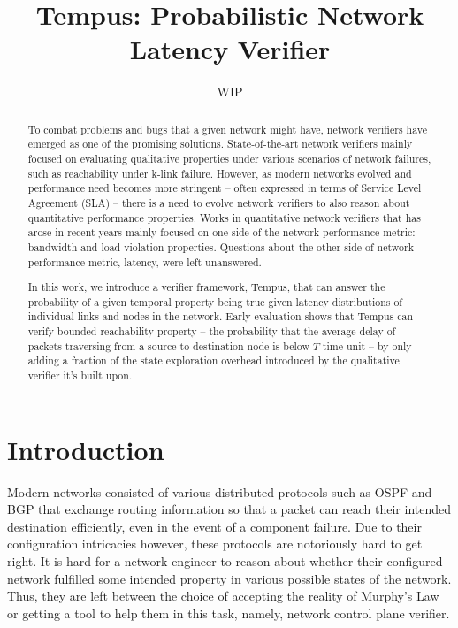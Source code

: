 \documentclass[10pt,sigconf,letterpaper,anonymous,nonacm]{acmart}
\title{Tempus: Probabilistic Network Latency Verifier}
\author{WIP}
\begin{document}
\begin{abstract}
    To combat problems and bugs that a given network might have, network verifiers have emerged as 
    one of the promising solutions. 
    State-of-the-art network verifiers mainly focused on evaluating qualitative properties under 
    various scenarios of network failures, such as reachability under k-link failure. 
    However, as modern networks evolved and performance need becomes more stringent -- often 
    expressed in terms of Service Level Agreement (SLA) -- there is a need to evolve network 
    verifiers to also reason about quantitative performance properties. 
    Works in quantitative network verifiers that has arose in recent years mainly focused on one 
    side of the network performance metric: bandwidth and load violation properties. 
    Questions about the other side of network performance metric, latency, were left unanswered. 

    In this work, we introduce a verifier framework, Tempus, that can answer the probability of 
    a given temporal property being true given latency distributions of individual links and 
    nodes in the network. 
    Early evaluation shows that Tempus can verify bounded reachability property -- the probability
    that the average delay of packets traversing from a source to destination node is below $T$
    time unit -- by only adding a fraction of the state exploration overhead introduced by the 
    qualitative verifier it's built upon.
\end{abstract}

\maketitle



\section{Introduction}
Modern networks consisted of various distributed protocols such as OSPF and BGP that exchange 
routing information so that a packet can reach their intended destination efficiently, even in the 
event of a component failure.
Due to their configuration intricacies however, these protocols are notoriously hard to get right. 
It is hard for a network engineer to reason about whether their configured network fulfilled some 
intended property in various possible states of the network. 
Thus, they are left between the choice of accepting the reality of Murphy's Law or getting a tool 
to help them in this task, namely, network control plane verifier.
\end{document}
